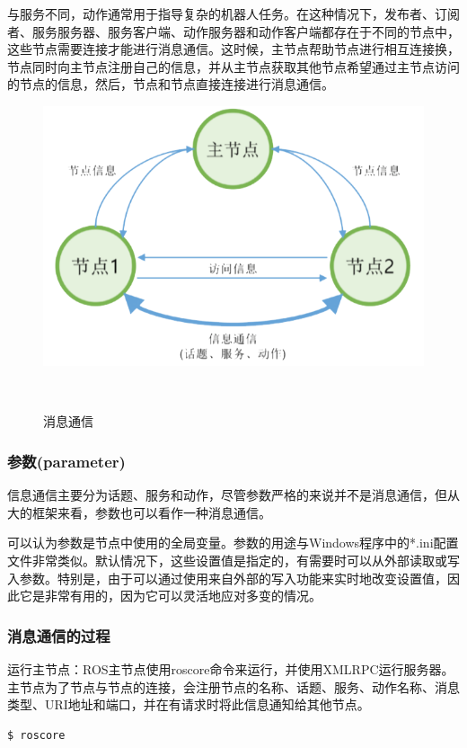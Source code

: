 \documentclass[geye,green,kindle,cn]{elegantnote}
\begin{document}
与服务不同，动作通常用于指导复杂的机器人任务。在这种情况下，发布者、订阅者、服务服务器、服务客户端、动作服务器和动作客户端都存在于不同的节点中，这些节点需要连接才能进行消息通信。这时候，主节点帮助节点进行相互连接换，节点同时向主节点注册自己的信息，并从主节点获取其他节点希望通过主节点访问的节点的信息，然后，节点和节点直接连接进行消息通信。
\begin{figure}[htbp]
    \centering
    \includegraphics[width=1\linewidth]{src/B.png}
    \centering
    \caption{消息通信} \label{picture:B}
\end{figure}
\subsubsection{参数(parameter)}
信息通信主要分为话题、服务和动作，尽管参数严格的来说并不是消息通信，但从大的框架来看，参数也可以看作一种消息通信。

可以认为参数是节点中使用的全局变量。参数的用途与Windows程序中的*.ini配置文件非常类似。默认情况下，这些设置值是指定的，有需要时可以从外部读取或写入参数。特别是，由于可以通过使用来自外部的写入功能来实时地改变设置值，因此它是非常有用的，因为它可以灵活地应对多变的情况。
\subsubsection{消息通信的过程}
运行主节点：ROS主节点使用roscore命令来运行，并使用XMLRPC运行服务器。主节点为了节点与节点的连接，会注册节点的名称、话题、服务、动作名称、消息类型、URI地址和端口，并在有请求时将此信息通知给其他节点。
\begin{lstlisting}[frame=single,language=bash]
    $ roscore
\end{lstlisting}
\end{document}
